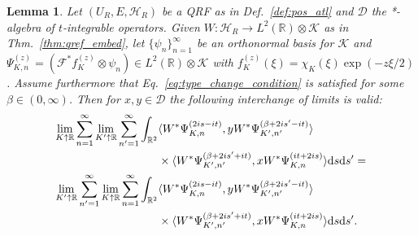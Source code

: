 \documentclass[sn-mathphys-num]{sn-jnl}%
\newcommand{\RR}{\mathbb{R}}
\newcommand{\HH}{\mathcal{H}}
\newcommand{\KK}{\mathcal{K}}
\newcommand{\diff}{\textup{d}}
\numberwithin{equation}{section}
\theoremstyle{thmstyleone}%
\newtheorem{lemma}[theorem]{Lemma}
\theoremstyle{thmstyletwo}%
\theoremstyle{thmstylethree}%
\begin{document}
\begin{lemma}
    \label{lem:F_int_lim}
    Let $(U_R,E,\HH_R)$ be a QRF as in Def.\ \ref{def:pos_atl} and $\mathcal{D}$ the *-algebra of $t$-integrable operators. Given $W:\HH_R\to L^2(\RR)\otimes\KK$ as in Thm.\ \ref{thm:qref_embed}, let $\{\psi_n\}_{n=1}^\infty$ be an orthonormal basis for $\KK$ and $\Psi_{K,n}^{(z)}=(\mathcal{F}^*f_K^{(z)}\otimes \psi_n)\in L^2(\RR)\otimes\KK$ with $f_K^{(z)}(\xi)=\chi_K(\xi)\exp(-z\xi/2)$. Assume furthermore that Eq.\ \eqref{eq:type_change_condition} is satisfied for some $\beta\in (0,\infty)$. Then for $x,y\in\mathcal{D}$ the following interchange of limits is valid:
\begin{align}
    \label{eq:lim_interchange}
    \lim_{K\uparrow\RR}\sum_{n=1}^\infty \lim_{K'\uparrow\RR}\sum_{n'=1}^\infty\int_{\RR^2}& \langle W^*\Psi_{K,n}^{(2is-it)},yW^*\Psi_{K',n'}^{(\beta+2is'-it)}\rangle\nonumber\\
    &\times\langle W^*\Psi_{K',n'}^{(\beta+2is'+it)},xW^*\Psi_{K,n}^{(it+2is)}\rangle\diff s\diff s'=\nonumber\\
    \lim_{K'\uparrow\RR}\sum_{n'=1}^\infty\lim_{K\uparrow\RR}\sum_{n=1}^\infty\int_{\RR^2}& \langle W^*\Psi_{K,n}^{(2is-it)},yW^*\Psi_{K',n'}^{(\beta+2is'-it)}\rangle\nonumber\\
    &\times\langle W^*\Psi_{K',n'}^{(\beta+2is'+it)},xW^*\Psi_{K,n}^{(it+2is)}\rangle\diff s\diff s'.
\end{align}
\end{lemma}
\end{document}
